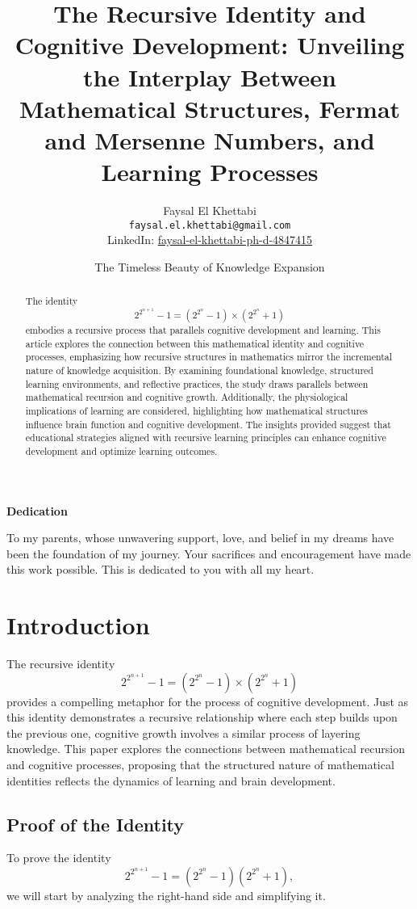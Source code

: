 \documentclass{article}
\title{The Recursive Identity and Cognitive Development: Unveiling the Interplay Between Mathematical Structures, Fermat and Mersenne Numbers, and Learning Processes}
\author{Faysal El Khettabi \\
\texttt{faysal.el.khettabi@gmail.com} \\
LinkedIn: \href{https://www.linkedin.com/in/faysal-el-khettabi-ph-d-4847415/}{faysal-el-khettabi-ph-d-4847415}}
\date{The Timeless Beauty of Knowledge Expansion}
\begin{document}
\maketitle

\begin{center}
    \textbf{Dedication}
\end{center}

To my parents, whose unwavering support, love, and belief in my dreams have been the foundation of my journey. Your sacrifices and encouragement have made this work possible. This is dedicated to you with all my heart.

\vspace{1em} %

\begin{abstract}
The identity 
\[
2^{2^{n + 1}} - 1 = (2^{2^n} - 1) \times (2^{2^n} + 1)
\]
embodies a recursive process that parallels cognitive development and learning. This article explores the connection between this mathematical identity and cognitive processes, emphasizing how recursive structures in mathematics mirror the incremental nature of knowledge acquisition. By examining foundational knowledge, structured learning environments, and reflective practices, the study draws parallels between mathematical recursion and cognitive growth. Additionally, the physiological implications of learning are considered, highlighting how mathematical structures influence brain function and cognitive development. The insights provided suggest that educational strategies aligned with recursive learning principles can enhance cognitive development and optimize learning outcomes.
\end{abstract}

\section{Introduction}
The recursive identity 
\[
2^{2^{n + 1}} - 1 = (2^{2^n} - 1) \times (2^{2^n} + 1)
\]
provides a compelling metaphor for the process of cognitive development. Just as this identity demonstrates a recursive relationship where each step builds upon the previous one, cognitive growth involves a similar process of layering knowledge. This paper explores the connections between mathematical recursion and cognitive processes, proposing that the structured nature of mathematical identities reflects the dynamics of learning and brain development. 

\subsection{Proof of the Identity}
To prove the identity 
\[
2^{2^{n+1}} - 1 = (2^{2^n} - 1)(2^{2^n} + 1),
\]
we will start by analyzing the right-hand side and simplifying it.
\end{document}
